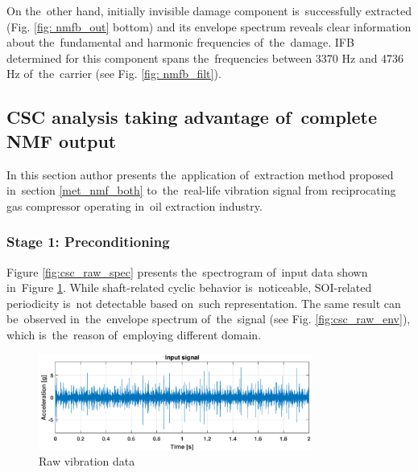 On the~other hand, initially invisible damage component is~successfully extracted (Fig. \ref{fig: nmfb_out} bottom) and its envelope spectrum reveals clear information about the~fundamental and harmonic frequencies of~the~damage. IFB determined for this component spans the~frequencies between 3370 Hz and 4736 Hz of~the~carrier (see Fig. \ref{fig: nmfb_filt}).


\subsection{CSC analysis taking advantage of~complete NMF output}\label{result_both}

In this section author presents the~application of~extraction method proposed in~section \ref{met_nmf_both} to~the~real-life vibration signal from reciprocating gas compressor operating in~oil extraction industry.

\subsubsection{Stage 1: Preconditioning}

Figure \ref{fig:csc_raw_spec} presents the~spectrogram of~input data shown in~Figure \ref{fig:csc_raw}. While shaft-related cyclic behavior is~noticeable, SOI-related periodicity is~not detectable based on~such representation. The same result can be~observed in~the~envelope spectrum of~the~signal (see Fig. \ref{fig:csc_raw_env}), which is~the~reason of~employing different domain.

\begin{figure}[ht!]
\centering
\includegraphics[width=0.8\textwidth]{wykresy/csc_raw}
\caption{Raw vibration data}
\label{fig:csc_raw}
\end{figure}

